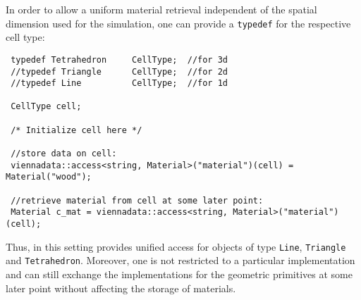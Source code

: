In order to allow a uniform material retrieval independent of the spatial dimension used for the simulation, one can provide a \lstinline|typedef| for the respective cell type:
\begin{lstlisting}
 typedef Tetrahedron     CellType;  //for 3d
 //typedef Triangle      CellType;  //for 2d
 //typedef Line          CellType;  //for 1d

 CellType cell;

 /* Initialize cell here */

 //store data on cell:
 viennadata::access<string, Material>("material")(cell) = Material("wood");

 //retrieve material from cell at some later point:
 Material c_mat = viennadata::access<string, Material>("material")(cell);
\end{lstlisting}
Thus, in this setting {\ViennaData} provides unified access for objects of type \lstinline|Line|, \lstinline|Triangle| and \lstinline|Tetrahedron|.
Moreover, one is not restricted to a particular implementation and can still exchange the implementations for the geometric primitives at some later point without affecting the storage of materials.



